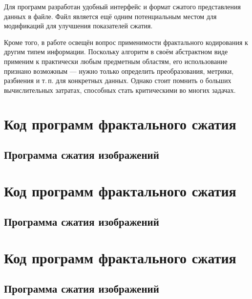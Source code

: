 \documentclass[bachelor,paper]{pmk-graduate}
\theoremstyle{definition}
\begin{document}
Для программ разработан удобный интерфейс и формат сжатого представления данных в файле. Файл является ещё одним потенциальным местом для модификаций для улучшения показателей сжатия.

Кроме того, в работе освещён вопрос применимости фрактального кодирования к другим типем информации. Поскольку алгоритм в своём абстрактном виде применим к практически любым предметным областям, его использование признано возможным --- нужно только определить преобразования, метрики, разбиения и т.\,п. для конкретных данных. Однако стоит помнить о больших вычислительных затратах, способных стать критическими во многих задачах.

\printthebibliography

\appendix
\chapter{Код программ фрактального сжатия}
\section{Программа сжатия изображений}
\chapter{Код программ фрактального сжатия}
\section{Программа сжатия изображений}
\chapter{Код программ фрактального сжатия}
\section{Программа сжатия изображений}
\end{document}
